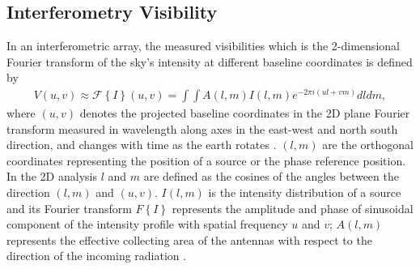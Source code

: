 \subsection{Interferometry Visibility}
In an interferometric array, the measured visibilities  which is the 2-dimensional Fourier transform of the sky's intensity at different baseline coordinates is defined by
\begin{align}
V(u,v)\approx \mathcal{F}\left\{I\right\}(u,v)=\int \int A(l,m) I (l,m)e^{-2\pi i(ul+vm)} dl dm,
\label{Vis}
\end{align}
where $(u,v)$ denotes the projected baseline coordinates in the 2D plane Fourier transform measured in wavelength along axes in the east-west and north south direction,  and changes with time as the earth rotates  \citep{taylor1999synthesis}. $(l, m)$ are the orthogonal coordinates representing the position of a source or the phase reference position. In the 2D analysis $l$ and $m$ are defined as the cosines of the  angles between the direction $(l,m)$ and $(u, v)$. $I(l,m)$ is the intensity distribution of a source and its Fourier transform  ${F}\left\{I\right\}$ represents the amplitude and phase of sinusoidal component of the intensity profile with spatial frequency $u$ and $v$; $A(l, m)$ represents the effective collecting area of the antennas with respect to the direction of the incoming radiation \citep{thompson2001interferometry}.

